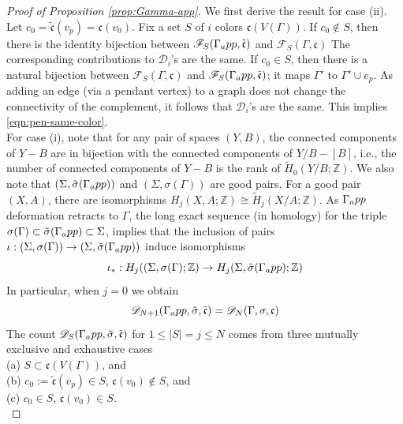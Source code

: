 \documentclass[10pt, reqno]{amsart}
\newcommand{\hf}{\hspace*{0.5cm}}
\theoremstyle{plain}
\theoremstyle{remark}
\theoremstyle{definition}
\numberwithin{equation}{section}
\begin{document}
\begin{proof}[Proof of Proposition \ref{prop:Gamma-app}]
We first derive the result for case (ii). Let $c_0=\tilde{\mathfrak{c}}(v_p)=\mathfrak{c}(v_0)$. Fix a set $S$ of $i$ colors $\mathfrak{c}(V(\Gamma))$. If $c_0\not\in S$, then there is the identity bijection between $\mathscr{F}_S(\Gamma_\textup{app},\tilde{\mathfrak{c}})$ and $\mathscr{F}_S(\Gamma,\mathfrak{c})$ The corresponding contributions to $\mathscr{D}_i$'s are the same. If $c_0\in S$, then there is a natural bijection between $\mathscr{F}_S(\Gamma,\mathfrak{c})$ and $\mathscr{F}_S(\Gamma_\textup{app},\tilde{\mathfrak{c}})$; it maps $\Gamma'$ to $\Gamma'\cup e_p$. As adding an edge (via a pendant vertex) to a graph does not change the connectivity of the complement, it follows that $\mathscr{D}_i$'s are the same. This implies \eqref{eqn:pen-same-color}.\\
\hf For case (i), note that for any pair of spaces $(Y,B)$, the connected components of $Y-B$ are in bijection with the connected components of $Y/B -[B]$, i.e., the number of connected components of $Y-B$ is the rank of $\tilde{H}_0(Y/B;\mathbb{Z})$. We also note that $(\Sigma,\tilde{\sigma}(\Gamma_\textup{app}))$ and $(\Sigma,\sigma(\Gamma))$ are good pairs. For a good pair $(X,A)$, there are isomorphisms $H_j(X,A;\mathbb{Z})\cong \tilde{H}_j(X/A;\mathbb{Z})$. As $\Gamma_\textup{app}$ deformation retracts to $\Gamma$, the long exact sequence (in homology) for the triple $\sigma(\Gamma)\subset \tilde{\sigma}(\Gamma_\textup{app})\subset \Sigma$, implies that the inclusion of pairs $\iota:(\Sigma,\sigma(\Gamma))\to (\Sigma,\tilde{\sigma}(\Gamma_\textup{app}))$ induce isomorphisms
$$\iota_\ast: H_j((\Sigma,\sigma(\Gamma);\mathbb{Z})\to H_j(\Sigma,\tilde{\sigma}(\Gamma_\textup{app});\mathbb{Z})$$
In particular, when $j=0$ we obtain 
\begin{equation}\label{eqn:Dapp}
\mathscr{D}_{N+1}(\Gamma_\textup{app},\tilde{\sigma},\tilde{\mathfrak{c}})=\mathscr{D}_N(\Gamma,\sigma,\mathfrak{c})
\end{equation}
The count $\mathscr{D}_S(\Gamma_\textup{app},\tilde{\sigma},\tilde{\mathfrak{c}})$ for $1\leq |S|=j\leq N$ comes from three mutually exclusive and exhaustive cases\\
\hf (a) $S\subset \mathfrak{c}(V(\Gamma))$, and\\
\hf (b) $c_0:=\tilde{\mathfrak{c}}(v_p)\in S$, $\mathfrak{c}(v_0)\not\in S$, and\\
\hf (c) $c_0\in S$, $\mathfrak{c}(v_0)\in S$.\\

\end{proof}
\end{document}
